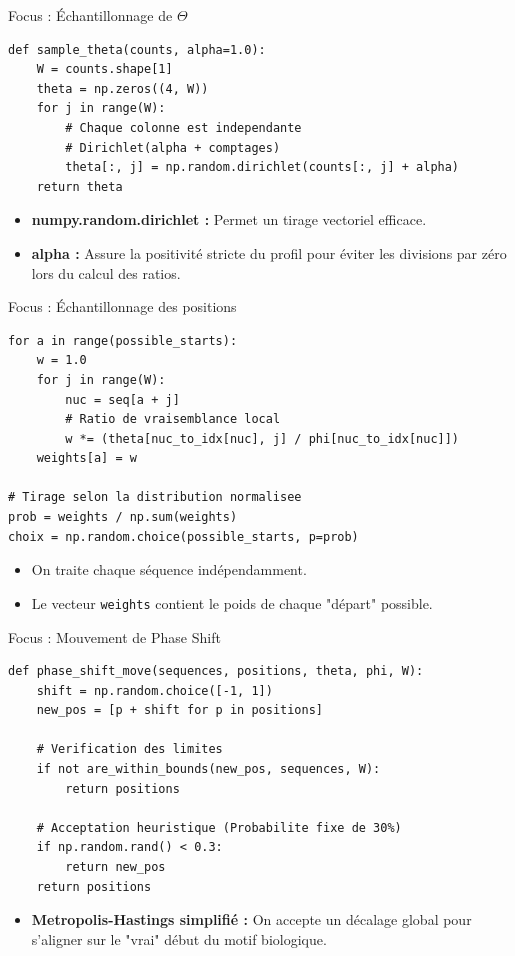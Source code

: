 \documentclass[10pt]{beamer}
\begin{document}
\begin{frame}[fragile]{Focus : Échantillonnage de $\Theta$}
\begin{lstlisting}
def sample_theta(counts, alpha=1.0):
    W = counts.shape[1]
    theta = np.zeros((4, W))
    for j in range(W):
        # Chaque colonne est independante
        # Dirichlet(alpha + comptages)
        theta[:, j] = np.random.dirichlet(counts[:, j] + alpha)
    return theta
\end{lstlisting}
\begin{itemize}
    \item \textbf{numpy.random.dirichlet :} Permet un tirage vectoriel efficace.
    \item \textbf{alpha :} Assure la positivité stricte du profil pour éviter les divisions par zéro lors du calcul des ratios.
\end{itemize}
\end{frame}

\begin{frame}[fragile]{Focus : Échantillonnage des positions}
\begin{lstlisting}
for a in range(possible_starts):
    w = 1.0
    for j in range(W):
        nuc = seq[a + j]
        # Ratio de vraisemblance local
        w *= (theta[nuc_to_idx[nuc], j] / phi[nuc_to_idx[nuc]])
    weights[a] = w

# Tirage selon la distribution normalisee
prob = weights / np.sum(weights)
choix = np.random.choice(possible_starts, p=prob)
\end{lstlisting}
\begin{itemize}
    \item On traite chaque séquence indépendamment.
    \item Le vecteur \texttt{weights} contient le poids de chaque "départ" possible.
\end{itemize}
\end{frame}

\begin{frame}[fragile]{Focus : Mouvement de Phase Shift}
\begin{lstlisting}
def phase_shift_move(sequences, positions, theta, phi, W):
    shift = np.random.choice([-1, 1])
    new_pos = [p + shift for p in positions]
    
    # Verification des limites
    if not are_within_bounds(new_pos, sequences, W):
        return positions

    # Acceptation heuristique (Probabilite fixe de 30%)
    if np.random.rand() < 0.3:
        return new_pos
    return positions
\end{lstlisting}
\begin{itemize}
    \item \textbf{Metropolis-Hastings simplifié :} On accepte un décalage global pour s'aligner sur le "vrai" début du motif biologique.
\end{itemize}
\end{frame}
\end{document}
